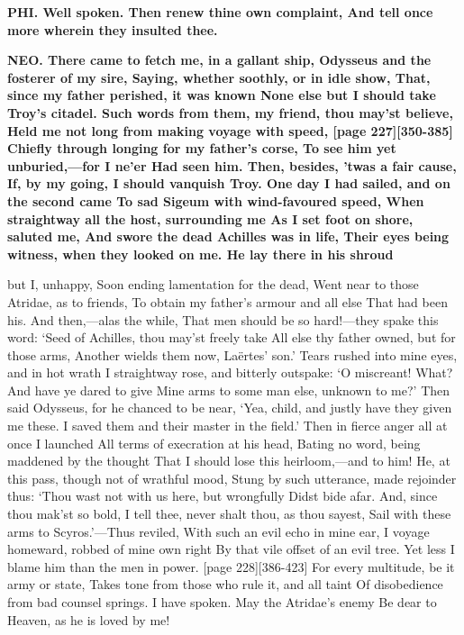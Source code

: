 \documentclass[11pt,letter]{book}
\begin{document}
\par \textbf{PHI. Well spoken. Then renew thine own complaint, And tell once more wherein they insulted thee.}
\par 

\par \textbf{NEO. There came to fetch me, in a gallant ship, Odysseus and the fosterer of my sire, Saying, whether soothly, or in idle show, That, since my father perished, it was known None else but I should take Troy’s citadel. Such words from them, my friend, thou may’st believe, Held me not long from making voyage with speed, [page 227][350-385] Chiefly through longing for my father’s corse, To see him yet unburied,—for I ne’er Had seen him. Then, besides, ’twas a fair cause, If, by my going, I should vanquish Troy. One day I had sailed, and on the second came To sad Sigeum with wind-favoured speed, When straightway all the host, surrounding me As I set foot on shore, saluted me, And swore the dead Achilles was in life, Their eyes being witness, when they looked on me. He lay there in his shroud}
\par   but I, unhappy, Soon ending lamentation for the dead, Went near to those Atridae, as to friends, To obtain my father’s armour and all else That had been his. And then,—alas the while, That men should be so hard!—they spake this word:  ‘Seed of Achilles, thou may’st freely take All else thy father owned, but for those arms, Another wields them now, Laërtes’ son.’ Tears rushed into mine eyes, and in hot wrath I straightway rose, and bitterly outspake:  ‘O miscreant! What? And have ye dared to give Mine arms to some man else, unknown to me?’ Then said Odysseus, for he chanced to be near, ‘Yea, child, and justly have they given me these. I saved them and their master in the field.’ Then in fierce anger all at once I launched All terms of execration at his head, Bating no word, being maddened by the thought That I should lose this heirloom,—and to him! He, at this pass, though not of wrathful mood, Stung by such utterance, made rejoinder thus:  ‘Thou wast not with us here, but wrongfully Didst bide afar. And, since thou mak’st so bold, I tell thee, never shalt thou, as thou sayest, Sail with these arms to Scyros.’—Thus reviled, With such an evil echo in mine ear, I voyage homeward, robbed of mine own right By that vile offset of an evil tree. Yet less I blame him than the men in power. [page 228][386-423] For every multitude, be it army or state, Takes tone from those who rule it, and all taint Of disobedience from bad counsel springs. I have spoken. May the Atridae’s enemy Be dear to Heaven, as he is loved by me!
\end{document}
